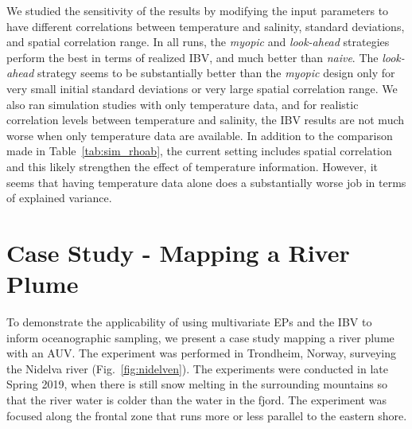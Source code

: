 \documentclass[aoas]{imsart}
\begin{document}

We studied the sensitivity of the results by modifying the input
parameters to have different correlations between temperature and
salinity, standard deviations, and spatial correlation range.  In all
runs, the \textit{myopic} and \textit{look-ahead} strategies perform
the best in terms of realized IBV, and much better than
\textit{naive}. The \textit{look-ahead} strategy seems to be
substantially better than the \textit{myopic} design only for very
small initial standard deviations or very large spatial correlation
range. 
We also ran simulation studies with only temperature data, and for
realistic correlation levels between temperature and salinity, the IBV
results are not much worse when only temperature data are
available. In addition to the comparison made in
Table~\ref{tab:sim_rhoab}, the current setting includes spatial
correlation and this likely strengthen the effect of temperature information. However, it seems that having temperature data alone
does a substantially worse job in terms of explained variance.

\section{Case Study - Mapping a River Plume}
\label{sec:case_study}

To demonstrate the applicability of using multivariate EPs and the IBV
to inform oceanographic sampling, we present a case study mapping a
river plume with an AUV. The experiment was performed in Trondheim,
Norway, surveying the Nidelva river (Fig.~\ref{fig:nidelven}). The
experiments were conducted in late Spring 2019, when there is still
snow melting in the surrounding mountains so that the river water is colder than the water in the fjord. The experiment was
focused along the frontal zone that runs more or less parallel to the
eastern shore.
\end{document}
